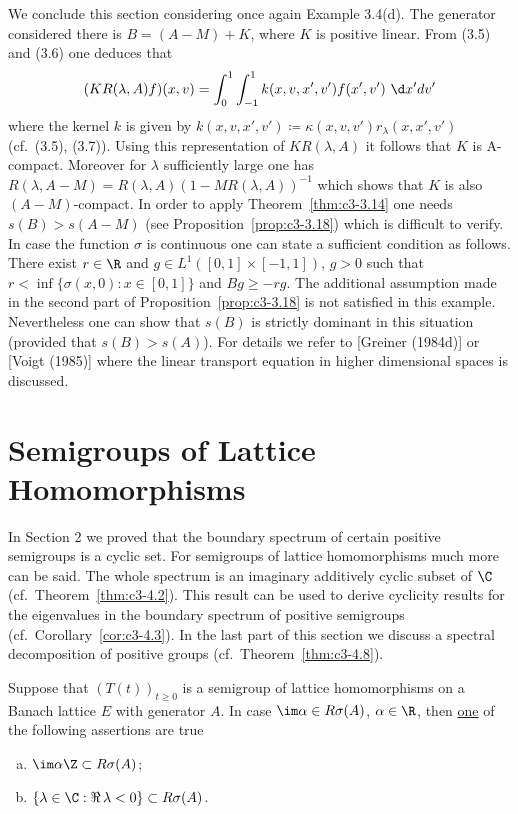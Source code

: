 We conclude this section considering once again Example 3.4(d).
The generator considered there is $B = (A - M) + K$, where $K$ is
%
positive linear. 
From (3.5) and (3.6) one deduces that 
\[
(KR(\lambda,A)f)(x,v) = \int_{0}^{1}\int_{-1}^{1} k(x,v,x',v')f(x',v')~\d x'dv'
\]
where the kernel $k$ is given by $k(x,v,x',v') \coloneqq  \kappa(x,v,v')r_{\lambda}(x,x',v')$ (cf.\ (3.5), (3.7)). 
Using this representation of $KR(\lambda,A)$ it follows that $K$ is A-compact. 
Moreover for $\lambda$ sufficiently large one has $R(\lambda,A-M) = R(\lambda,A)(1 - MR(\lambda,A))^{-1}$ which shows that $K$ is also $(A-M)$-compact. 
In order to apply Theorem~\ref{thm:c3-3.14} one needs $s(B) > s(A-M)$ (see Proposition~\ref{prop:c3-3.18}) which is difficult to verify. 
In case the function $\sigma$ is continuous one can state a sufficient condition as follows.
There exist $r \in \R $ and $g \in L^{1}([0,1]\times[-1,1])$, $g > 0$ such that $r < \inf\{\sigma(x,0) : x \in [0,1]\}$ and $Bg \geq -rg$.
The additional assumption made in the second part of Proposition~\ref{prop:c3-3.18} is not satisfied in this example. 
Nevertheless one can show that $s(B)$ is strictly dominant in this situation (provided that $s(B) > s(A)$). 
For details we refer to [Greiner (1984d)] or [Voigt (1985)] where the linear transport equation in higher dimensional spaces is discussed.

\section{Semigroups of Lattice Homomorphisms}\label{sec:c3-4}

In Section 2 we proved that the boundary spectrum of certain positive semigroups is a cyclic set. 
For semigroups of lattice homomorphisms much more can be said. The whole spectrum is an imaginary additively cyclic subset of $\C $ (cf.\ Theorem~\ref{thm:c3-4.2}). 
This result can be used to derive cyclicity results for the eigenvalues in the boundary spectrum of positive semigroups (cf.\ Corollary~\ref{cor:c3-4.3}). 
In the last part of this section we discuss a spectral decomposition of positive groups (cf.\ Theorem~\ref{thm:c3-4.8}).

\begin{lemma}\label{lem:c3-4.1}
	Suppose that $(T(t))_{t \ge 0}$ is a semigroup of lattice homomorphisms on a Banach lattice $E$ with generator $A$.
	In case $\im\alpha \in R\sigma(A)$, $\alpha \in \R $, then \underline{one} of the following assertions are true
	\begin{enumerate}[(a)]
		\item $\im\alpha\Z \subset R\sigma(A)$;
		\item $\{\lambda \in \C  : \Re\,\lambda < 0 \} \subset R\sigma(A)$.
	\end{enumerate}
\end{lemma}

